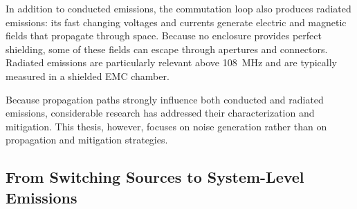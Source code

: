 In addition to conducted emissions, the commutation loop also produces radiated emissions: its fast changing voltages and currents generate electric and magnetic fields that propagate through space.
Because no enclosure provides perfect shielding, some of these fields can escape through apertures and connectors.
Radiated emissions are particularly relevant above \SI{108}{\mega\hertz} and are typically measured in a shielded EMC chamber.

Because propagation paths strongly influence both conducted and radiated emissions, considerable research has addressed their characterization and mitigation.
This thesis, however, focuses on noise generation rather than on propagation and mitigation strategies.

\subsection{From Switching Sources to System-Level Emissions}


